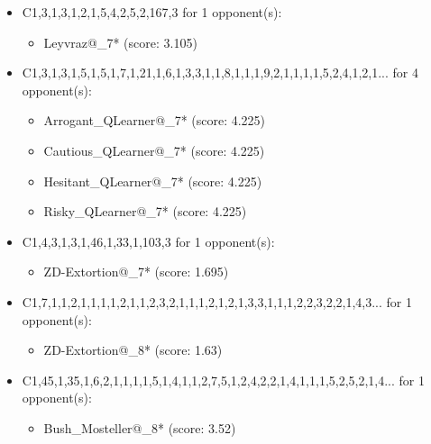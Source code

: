 \begin{appendices}
\begin{itemize}
    \item C1,3,1,3,1,2,1,5,4,2,5,2,167,3 for 1 opponent(s):
    \begin{multicols}{3}
         \begin{itemize}
            \item Leyvraz@\_7* (score: 3.105)
        \end{itemize}
     \end{multicols}
     
    \item C1,3,1,3,1,5,1,5,1,7,1,21,1,6,1,3,3,1,1,8,1,1,1,9,2,1,1,1,1,5,2,4,1,2,1... for 4 opponent(s):
    \begin{multicols}{3}
         \begin{itemize}
            \item Arrogant\_QLearner@\_7* (score: 4.225)
            \item Cautious\_QLearner@\_7* (score: 4.225)
            \item Hesitant\_QLearner@\_7* (score: 4.225)
            \item Risky\_QLearner@\_7* (score: 4.225)
        \end{itemize}
     \end{multicols}
     
    \item C1,4,3,1,3,1,46,1,33,1,103,3 for 1 opponent(s):
    \begin{multicols}{3}
         \begin{itemize}
            \item ZD-Extortion@\_7* (score: 1.695)
        \end{itemize}
     \end{multicols}
     
    \item C1,7,1,1,2,1,1,1,1,2,1,1,2,3,2,1,1,1,2,1,2,1,3,3,1,1,1,2,2,3,2,2,1,4,3... for 1 opponent(s):
    \begin{multicols}{3}
         \begin{itemize}
            \item ZD-Extortion@\_8* (score: 1.63)
        \end{itemize}
     \end{multicols}
     
    \item C1,45,1,35,1,6,2,1,1,1,1,5,1,4,1,1,2,7,5,1,2,4,2,2,1,4,1,1,1,5,2,5,2,1,4... for 1 opponent(s):
    \begin{multicols}{3}
         \begin{itemize}
            \item Bush\_Mosteller@\_8* (score: 3.52)
        \end{itemize}
     \end{multicols}
     

\end{itemize}
\end{appendices}
